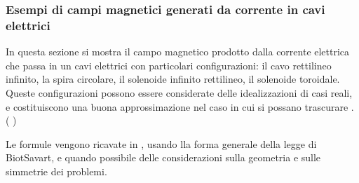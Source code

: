 \documentclass[letterpaper,10pt,italian]{jupyterBook}
\begin{document}
\subsubsection{Esempi di campi magnetici generati da corrente in cavi elettrici}
\label{\detokenize{ch/electromagnetism/electromagnetism-steady:esempi-di-campi-magnetici-generati-da-corrente-in-cavi-elettrici}}
\sphinxAtStartPar
In questa sezione si mostra il campo magnetico prodotto dalla corrente elettrica che passa in un cavi elettrici con particolari configurazioni: il cavo rettilineo infinito, la spira circolare, il solenoide infinito rettilineo, il solenoide toroidale. Queste configurazioni possono essere considerate delle idealizzazioni di casi reali, e costituiscono una buona approssimazione nel caso in cui si possano trascurare . ( )

\sphinxAtStartPar
Le formule vengono ricavate in {\hyperref[\detokenize{ch/electromagnetism/electromagnetism-steady-notes:physics-hs-electromagnetism-electromagnetism-steady-notes-biot-savart}]{}}, usando lla forma generale della legge di Biot\sphinxhyphen{}Savart, e quando possibile delle considerazioni sulla geometria e sulle simmetrie dei problemi.
\end{document}
